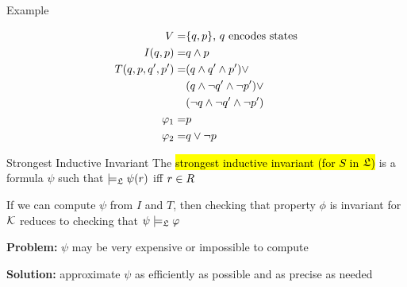 
\begin{frame}{Example}
\begin{center}
\end{center}
\begin{align*}
V =& \{q, p\} \text{, $q$ encodes states} \\
I(q, p) =& q \wedge p \\
T(q, p, q', p') = 
  & (q \wedge q' \wedge p') \vee \\
  & (q \wedge \neg q' \wedge \neg p') \vee \\
  & (\neg q \wedge \neg q' \wedge \neg p') \\
\varphi_1 =& p \\
\varphi_2 =& q \vee \neg p
\end{align*}
\end{frame}


\begin{frame}{Strongest Inductive Invariant}
The \hl{strongest inductive invariant (for $S$ in $\mathfrak{L}$)} is a formula
$\psi$ such that $\models_{\mathfrak{L}} \psi(r)$ iff $r \in R$

\bigskip
If we can compute $\psi$ from $I$ and $T$, then checking that property $\phi$ is
invariant for ${\cal K}$ reduces to checking that $\psi \models_{\mathfrak{L}} \varphi$

\bigskip
\textbf{Problem:} $\psi$ may be very expensive or impossible to compute

\bigskip
\textbf{Solution:} approximate $\psi$ as efficiently as possible and as precise as needed
\end{frame}

